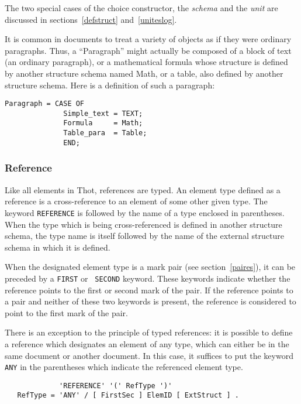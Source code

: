 The two special cases of the choice constructor, the {\em schema} and
the {\em unit} are discussed in sections~\ref{defstruct}
and~\ref{uniteslog}.

\begin{example}
It is common in documents to treat a variety of objects as if they
were ordinary paragraphs.  Thus, a ``Paragraph'' might actually be
composed of a block of text (an ordinary paragraph), or a mathematical
formula whose structure is defined by another structure schema named
Math, or a table, also defined by another structure schema.  Here is a
definition of such a paragraph:

\begin{verbatim}
Paragraph = CASE OF
              Simple_text = TEXT;
              Formula     = Math;
              Table_para  = Table;
              END;
\end{verbatim}
\end{example}

\subsubsection{Reference}
\label{references}

Like all elements in Thot, references are typed.  An element type
defined as a reference is a cross-reference to an element of some
other given type.  The keyword {\tt REFERENCE} is followed by the name
of a type enclosed in parentheses.  When the type which is being
cross-referenced is defined in another structure schema, the type name
is itself followed by the name of the external structure schema in
which it is defined.

When the designated element type is a mark pair (see
section~\ref{paires}), it can be preceded by a {\tt FIRST} or {\tt
SECOND} keyword.  These keywords indicate whether the reference points
to the first or second mark of the pair.  If the reference points to a
pair and neither of these two keywords is present, the reference is
considered to point to the first mark of the pair.

There is an exception to the principle of typed references:  it is
possible to define a reference which designates an element of any
type, which can either be in the same document or another document.
In this case, it suffices to put the keyword {\tt ANY} in the
parentheses which indicate the referenced element type.

\begin{verbatim}
             'REFERENCE' '(' RefType ')'
   RefType = 'ANY' / [ FirstSec ] ElemID [ ExtStruct ] .
\end{verbatim}

